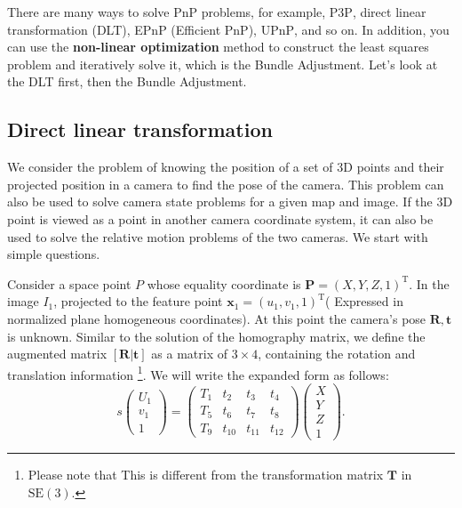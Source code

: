 There are many ways to solve PnP problems, for example, P3P\textsuperscript{\cite{GaoHouTangEtAl2003}}, direct linear transformation (DLT), EPnP (Efficient PnP)\textsuperscript{\cite{LepetitMoreno-NoguerFua2008 with 3-point estimation pose. }}, UPnP\textsuperscript{\cite{Penate-SanchezAndrade-CettoMoreno-Noguer2013}}, and so on. In addition, you can use the \textbf{non-linear optimization} method to construct the least squares problem and iteratively solve it, which is the Bundle Adjustment. Let's look at the DLT first, then the Bundle Adjustment.

\subsection{Direct linear transformation}
We consider the problem of knowing the position of a set of 3D points and their projected position in a camera to find the pose of the camera. This problem can also be used to solve camera state problems for a given map and image. If the 3D point is viewed as a point in another camera coordinate system, it can also be used to solve the relative motion problems of the two cameras. We start with simple questions.

Consider a space point $P$ whose equality coordinate is ${\bm{P}}=(X,Y,Z,1)^{\mathrm{T}}$. In the image $I_{1}$, projected to the feature point ${\bm{x}}_{1}=(u_{1}, v_{1}, 1)^{\mathrm{T}}$( Expressed in normalized plane homogeneous coordinates). At this point the camera's pose $\bm{R}, \bm{t}$ is unknown. Similar to the solution of the homography matrix, we define the augmented matrix $[\bm{R}|\bm{t}]$ as a matrix of $3\times 4$, containing the rotation and translation information \footnote{Please note that This is different from the transformation matrix $\bm{T}$ in $\mathrm{SE}(3)$. }. We will write the expanded form as follows:
\begin{equation}
s
\begin{pmatrix}
U_{1} \\ v_{1} \\ 1
\end{pmatrix}
=
\begin{pmatrix}
T_{1} & t_{2} & t_{3} & t_{4}\\
T_{5} & t_{6} & t_{7} & t_{8}\\
T_{9} & t_{10} & t_{11} & t_{12}
\end{pmatrix}
\begin{pmatrix}
X \\ Y \\ Z \\ 1
\end{pmatrix}.
\end{equation}

